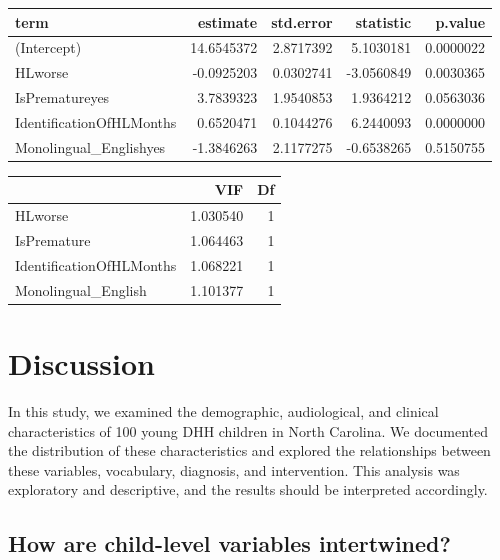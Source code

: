 \documentclass[
  english,
  man]{apa6}
\begin{document}
\begin{table}[H]
\centering
\begin{tabular}{l|r|r|r|r}
\hline
term & estimate & std.error & statistic & p.value\\
\hline
(Intercept) & 14.6545372 & 2.8717392 & 5.1030181 & 0.0000022\\
\hline
HLworse & -0.0925203 & 0.0302741 & -3.0560849 & 0.0030365\\
\hline
IsPrematureyes & 3.7839323 & 1.9540853 & 1.9364212 & 0.0563036\\
\hline
IdentificationOfHLMonths & 0.6520471 & 0.1044276 & 6.2440093 & 0.0000000\\
\hline
Monolingual\_Englishyes & -1.3846263 & 2.1177275 & -0.6538265 & 0.5150755\\
\hline
\end{tabular}
\end{table}

\begin{table}[H]
\centering
\begin{tabular}{l|r|r}
\hline
  & VIF & Df\\
\hline
HLworse & 1.030540 & 1\\
\hline
IsPremature & 1.064463 & 1\\
\hline
IdentificationOfHLMonths & 1.068221 & 1\\
\hline
Monolingual\_English & 1.101377 & 1\\
\hline
\end{tabular}
\end{table}

\hypertarget{discussion}{%
\section{Discussion}\label{discussion}}

In this study, we examined the demographic, audiological, and clinical characteristics of 100 young DHH children in North Carolina. We documented the distribution of these characteristics and explored the relationships between these variables, vocabulary, diagnosis, and intervention. This analysis was exploratory and descriptive, and the results should be interpreted accordingly.

\hypertarget{how-are-child-level-variables-intertwined}{%
\subsection{How are child-level variables intertwined?}\label{how-are-child-level-variables-intertwined}}
\end{document}
